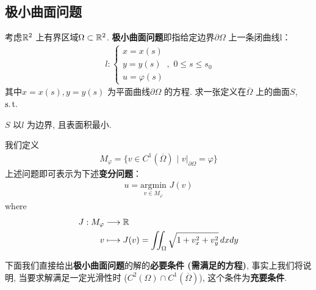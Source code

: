 \subsection{极小曲面问题}
	考虑$\mathbb{R}^2$ 上有界区域$\Omega \subset \mathbb{R}^2$.  \textbf{极小曲面问题}即指给定边界$\partial \Omega$ 上一条闭曲线l：
	\begin{align*}
		l : 
		\begin{cases}
			x = x(s) \\
			y = y(s) \\
			u = \varphi(s)
		\end{cases} , \,\, 0 \leq s \leq s_0
	\end{align*}
	其中$x = x(s) , y = y(s)$ 为平面曲线$\partial \Omega$ 的方程. 求一张定义在$\overline{\Omega}$ 上的曲面$S$, $\operatorname{s.t.}$
	\begin{center}
		$S$ 以$l$ 为边界, 且表面积最小. 
	\end{center}
	我们定义
	\begin{align*}
		M_{\varphi} = \Big\{ v \in C^1(\overline{\Omega}) \,\, \Big| \,\, v |_{\partial \Omega} = \varphi \Big\}
	\end{align*}
	上述问题即可表示为下述\textbf{变分问题}：
	\begin{align*}
		u = \underset{v \in M_{\varphi}}{\text{argmin}} \,\, J(v)
	\end{align*}
	where
	\begin{align*}
		J : M_{\varphi} &\longrightarrow \mathbb{R} \\
		v &\longmapsto J(v) = \iint_{\Omega} \sqrt{1 + v_{x}^2 + v_{y}^2} \, dxdy
	\end{align*}
	
	\vspace*{4em}
	
	下面我们直接给出\textbf{极小曲面问题}的解的\textbf{必要条件 (需满足的方程)}, 事实上我们将说明, 当要求解满足一定光滑性时 ($C^2(\Omega) \cap C^1(\overline{\Omega})$), 这个条件为\textbf{充要条件}. 
	
	\newpage
	
